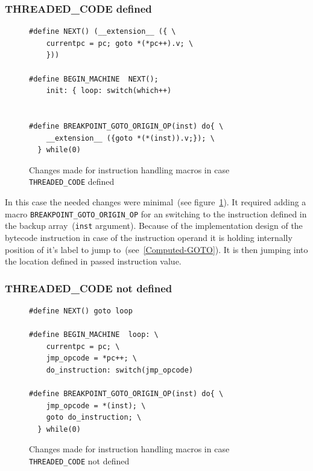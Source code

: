 \documentclass[thesis=M,english]{FITthesis}[2018/10/20]
\newcommand{\code}[1]{\texttt{#1}}
\begin{document}
{\subsubsection{THREADED{\_}CODE defined}

\begin{figure}[h]
\begin{lstlisting}
#define NEXT() (__extension__ ({ \
    currentpc = pc; goto *(*pc++).v; \
    }))

#define BEGIN_MACHINE  NEXT();
    init: { loop: switch(which++)


#define BREAKPOINT_GOTO_ORIGIN_OP(inst) do{ \
    __extension__ ({goto *(*(inst)).v;}); \
  } while(0)
\end{lstlisting}
	\caption{Changes made for instruction handling macros in case \code{THREADED{\_}CODE} defined}\label{fig:instruction-handling-threaded}
\end{figure}

In this case the needed changes were minimal~(see figure~\ref{fig:instruction-handling-threaded}). It required adding a macro \code{BREAKPOINT{\_}GOTO{\_}ORIGIN{\_}OP} for an switching to the instruction defined in the backup array~(\code{inst} argument). Because of the implementation design of the bytecode instruction in case of the instruction operand it is holding internally position of it's label to jump to~(see~\ref{Computed-GOTO}). It is then jumping into the location defined in passed instruction value.


\subsubsection{THREADED{\_}CODE not defined}

\begin{figure}[h]
\begin{lstlisting}
#define NEXT() goto loop

#define BEGIN_MACHINE  loop: \
    currentpc = pc; \
    jmp_opcode = *pc++; \
    do_instruction: switch(jmp_opcode)

#define BREAKPOINT_GOTO_ORIGIN_OP(inst) do{ \
    jmp_opcode = *(inst); \
    goto do_instruction; \
  } while(0)
\end{lstlisting}
	\caption{Changes made for instruction handling macros in case \code{THREADED{\_}CODE} not defined}\label{fig:instruction-handling-not-threaded}
\end{figure}

}
\end{document}
